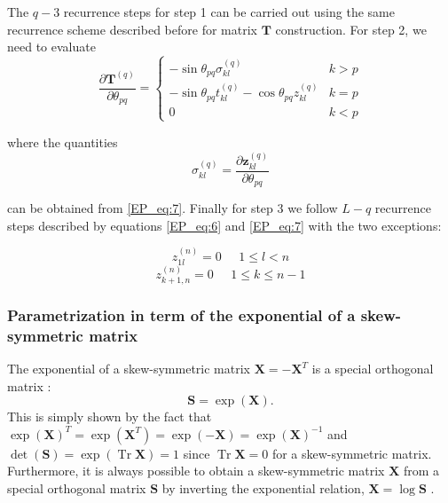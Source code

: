 \documentclass[preprint,amsmath,amssymb,superscriptaddress,showpacs,pre]{revtex4-1}
\DeclareMathOperator{\Tr}{Tr}
\begin{document}
The $q-3$ recurrence steps for step 1  can be carried out using the same recurrence scheme described before for matrix $\bm T$ construction. For step 2, we need to evaluate 
\begin{equation}
\frac{\partial\bm T^{(q)}}{\partial \theta_{pq} }  =
\begin{cases}
- \sin\theta_{pq} \sigma^{(q)}_{kl} & k>p\\
- \sin\theta_{pq} t^{(q)}_{kl} - \cos\theta_{pq} z^{(q)}_{kl} & k=p \\
0 & k<p
\end{cases}
\label{EP_eq:17}
\end{equation}

where the quantities
 \begin{equation}
\sigma^{(q)}_{kl}=\frac{\partial\bm z^{(q)}_{kl}}{\partial \theta_{pq} }  
\label{EP_eq:18}
\end{equation}

can be obtained from \eqref{EP_eq:7}. 
Finally for step 3 we follow $L-q$ recurrence steps described by equations \eqref{EP_eq:6} and \eqref{EP_eq:7} with the two exceptions:

 \begin{equation}
z^{(n)}_{1l}=0\;\;\;\;\;1\leq l < n
\label{EP_eq:19}
\end{equation}
 \begin{equation}
z^{(n)}_{k+1,n}=0  \;\;\;\;\;1\leq k \leq n-1
\label{EP_eq:20}
\end{equation}



\subsubsection{Parametrization in term of the exponential of a skew-symmetric matrix }
The exponential of a skew-symmetric matrix   $\bm X=-\bm X^T$ is  a  special orthogonal  matrix  : 
\begin{equation}
	\label{eq:sksym_def}
    \bm S=\exp (\bm X).
\end{equation}
This is simply shown by the fact that $\exp(\bm X)^T=\exp(\bm X^T)=\exp(-\bm X)=\exp(\bm X)^{-1}$ and $\det (\bm S)=\exp{(\Tr \bm X)}=1$ since $\Tr \bm X=0$ for a skew-symmetric matrix. Furthermore, it is always possible to obtain a skew-symmetric matrix $\bm X$ from a special orthogonal matrix $\bm S$ by inverting the exponential relation, $\bm X=\log \bm S$ \cite{Shepard_param_OM}. 
\end{document}

